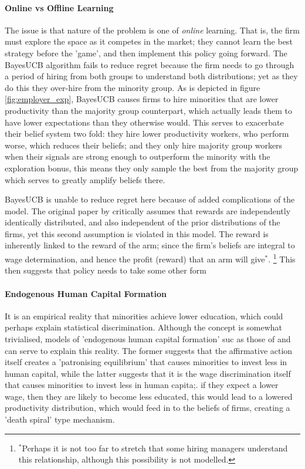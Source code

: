 \documentclass[]{article}
\begin{document}
\paragraph*{Online vs Offline Learning}
The issue is that nature of the problem is one of \textit{online} learning. That is, the firm must explore the space as it competes in the market; they cannot learn the best strategy before the 'game', and then implement this policy going forward. The BayesUCB algorithm fails to reduce regret because the firm needs to go through a period of hiring from both groups to understand both distributions; yet as they do this they over-hire from the minority group. As is depicted in figure \ref{fig:employer_exp}, BayesUCB causes firms to hire minorities that are lower productivity than the majority group counterpart, which actually leads them to have lower expectations than they otherwise would. This serves to exacerbate their belief system two fold: they hire lower productivity workers, who perform worse, which reduces their beliefs; and they only hire majority group workers when their signals are strong enough to outperform the minority with the exploration bonus, this means they only sample the best from the majority group which serves to greatly amplify beliefs there.

BayesUCB is unable to reduce regret here because of added complications of the model. The original paper by \citet{kaufmann2012} critically assumes that rewards are independently identically distributed, and also independent of the prior distributions of the firms, yet this second assumption is violated in this model. The reward is inherently linked to the reward of the arm; since the firm's beliefs are integral to wage determination, and hence the profit (reward) that an arm will give$^*$. \footnote{$^*$Perhaps it is not too far to stretch that some hiring managers understand this relationship, although this possibility is not modelled.} This then suggests that policy needs to take some other form

\paragraph*{Endogenous Human Capital Formation}
It is an empirical reality that minorities achieve lower education, which could perhaps explain statistical discrimination. Although the concept is somewhat trivialised, models of 'endogenous human capital formation' suc as those of \citet{CoatesLoury1993} and \citet{LunderbergStartz1983} can serve to explain this reality. The former suggests that the affirmative action itself creates a 'patronising equilibrium' that causes minorities to invest less in human capital, while the latter suggests that it is the wage discrimination itself that causes minorities to invest less in human capita;. if they expect a lower wage, then they are likely to become less educated, this would lead to a lowered productivity distribution, which would feed in to the beliefs of firms, creating a 'death spiral' type mechanism.
\end{document}
